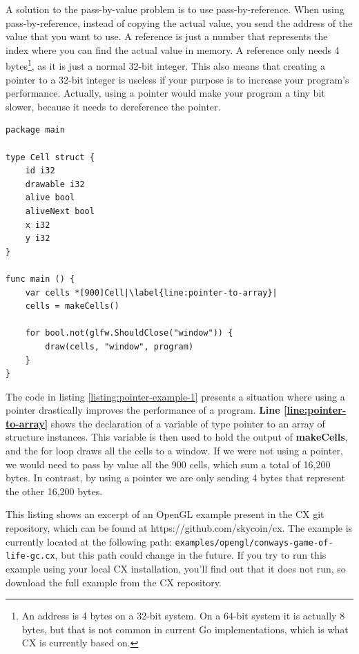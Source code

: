 \documentclass[11pt,fleqn,openany]{book} %
\begin{document}
A solution to the pass-by-value problem is to use pass-by-reference. When using pass-by-reference, instead of copying the actual value, you send the address of the value that you want to use. A reference is just a number that represents the index where you can find the actual value in memory. A reference only needs 4 bytes\footnote{An address is 4 bytes on a 32-bit system.  On a 64-bit system it is actually 8 bytes, but that is not common in current Go implementations, which is what CX is currently based on.}, as it is just a normal 32-bit integer. This also means that creating a pointer to a 32-bit integer is useless if your purpose is to increase your program's performance. Actually, using a pointer would make your program a tiny bit slower, because it needs to dereference the pointer.

\begin{lstlisting}[caption={Pointer to a structure instance},captionpos=b,label={listing:pointer-example-1}]
package main

type Cell struct {
	id i32
	drawable i32
	alive bool
	aliveNext bool
	x i32
	y i32
}

func main () {
	var cells *[900]Cell|\label{line:pointer-to-array}|
	cells = makeCells()
    
    for bool.not(glfw.ShouldClose("window")) {
        draw(cells, "window", program)
    }
}
\end{lstlisting}

The code in listing \ref{listing:pointer-example-1} presents a situation where using a pointer drastically improves the performance of a program. \textbf{Line \ref{line:pointer-to-array}} shows the declaration of a variable of type pointer to an array of structure instances. This variable is then used to hold the output of \textbf{makeCells}, and the for loop draws all the cells to a window. If we were not using a pointer, we would need to pass by value all the 900 cells, which sum a total of 16,200 bytes. In contrast, by using a pointer we are only sending 4 bytes that represent the other 16,200 bytes.

This listing shows an excerpt of an OpenGL example present in the CX git repository, which can be found at https://github.com/skycoin/cx. The example is currently located at the following path: \lstinline{examples/opengl/conways-game-of-life-gc.cx}, but this path could change in the future. If you try to run this example using your local CX installation, you'll find out that it does not run, so download the full example from the CX repository.
\end{document}
